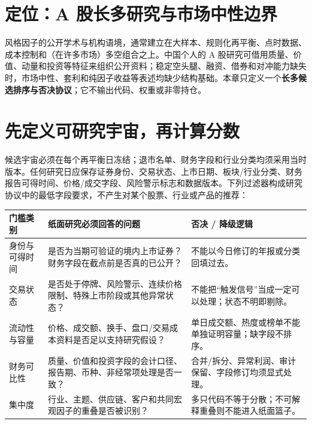 \section{定位：A 股长多研究与市场中性边界}

风格因子的公开学术与机构语境，通常建立在大样本、规则化再平衡、点时数据、成本控制和（在许多市场）多空组合之上。中国个人的 A 股研究可借用质量、价值、动量和投资等特征来组织公开资料；稳定空头腿、融资、借券和对冲能力缺失时，市场中性、套利和纯因子收益等表述均缺少结构基础。本章只定义一个\textbf{长多候选排序与否决协议}；它不输出代码、权重或非零持仓。

\section{先定义可研究宇宙，再计算分数}

候选宇宙必须在每个再平衡日冻结；退市名单、财务字段和行业分类均须采用当时版本。任何研究日应保存证券身份、交易状态、上市日期、板块/行业分类、财务报告可得时间、价格/成交字段、风险警示标志和数据版本。下列过滤器构成研究协议中的最低字段要求，不产生对某个股票、行业或产品的推荐：

\begin{exhibitbox}
\small
\begin{tabularx}{\exhibitboxwidth}{L{2.6cm}X L{3.65cm}}
\toprule
\textbf{门槛类别} & \textbf{纸面研究必须回答的问题} & \textbf{否决 / 降级逻辑} \\
\midrule
身份与可得时间 & 是否为当期可验证的境内上市证券？财务字段在截点前是否真的已公开？ & 不能以今日修订的年报或分类回填过去。 \\
交易状态 & 是否处于停牌、风险警示、连续价格限制、特殊上市阶段或其他异常状态？ & 不能把“触发信号”当成一定可以处理；状态不明即剔除。 \\
流动性与容量 & 价格、成交额、换手、盘口/交易成本资料是否足以支持研究假设？ & 单日成交额、热度或榜单不能单独证明容量；缺字段不排序。 \\
财务可比性 & 质量、价值和投资字段的会计口径、报告期、币种、非经常项处理是否一致？ & 合并/拆分、异常利润、审计保留、字段修订均须显式处理。 \\
集中度 & 行业、主题、供应链、客户和共同宏观因子的重叠是否被识别？ & 多只代码不等于分散；不可解释重叠则不能进入纸面篮子。 \\
\bottomrule
\end{tabularx}
\end{exhibitbox}

